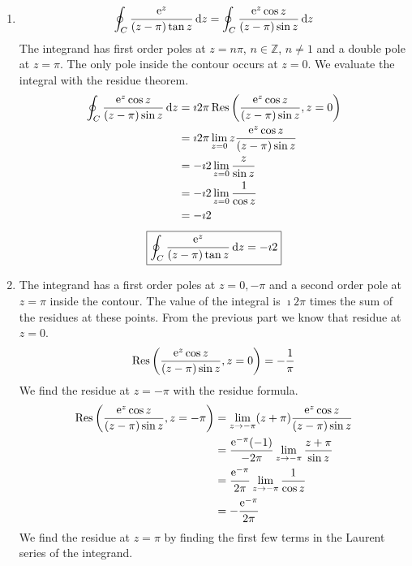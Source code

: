 {%
\begin{Solution}
  \label{solution e^z/((z-pi)tan(z))}
  \begin{enumerate}
  \item
    \[
    \oint_C \frac{\mathop{\mathrm{e}}\nolimits^z}{ (z - \pi) \tan z } \,\mathrm{d} z
    = \oint_C \frac{\mathop{\mathrm{e}}\nolimits^z \cos z}{ (z - \pi) \sin z } \,\mathrm{d} z
    \]
    The integrand has first order poles at $z = n \pi$, $n \in \mathbb{Z}$, 
    $n \neq 1$ and a double pole at $z = \pi$.
    The only pole inside the contour occurs at $z = 0$.  We evaluate the integral
    with the residue theorem.
    \begin{align*}
      \oint_C \frac{\mathop{\mathrm{e}}\nolimits^z \cos z}{ (z - \pi) \sin z } \,\mathrm{d} z
      &= \imath 2 \pi \mathop{\mathrm{Res}}\nolimits \left( \frac{\mathop{\mathrm{e}}\nolimits^z \cos z}{ (z - \pi) \sin z }, 
        z = 0 \right) \\
      &= \imath 2 \pi \lim_{z = 0} z \frac{\mathop{\mathrm{e}}\nolimits^z \cos z}{ (z - \pi) \sin z } \\
      &= - \imath 2 \lim_{z = 0} \frac{ z }{ \sin z } \\
      &= - \imath 2 \lim_{z = 0} \frac{ 1 }{ \cos z } \\
      &= - \imath 2 
    \end{align*}
    \[
    \boxed{
      \oint_C \frac{\mathop{\mathrm{e}}\nolimits^z}{ (z - \pi) \tan z } \,\mathrm{d} z = - \imath 2
      }
    \]
  \item
    The integrand has a first order poles at $z = 0, -\pi$ and a second order pole
    at $z = \pi$ inside the contour.  The value of the integral is $\imath 2 \pi$
    times the sum of the residues at these points.  From the previous part 
    we know that residue at $z = 0$.
    \[
    \mathop{\mathrm{Res}}\nolimits \left( \frac{\mathop{\mathrm{e}}\nolimits^z \cos z}{ (z - \pi) \sin z }, z = 0 \right) 
    = - \frac{1}{\pi}
    \]
    We find the residue at $z = -\pi$ with the residue formula.
    \begin{align*}
      \mathop{\mathrm{Res}}\nolimits \left( \frac{\mathop{\mathrm{e}}\nolimits^z \cos z}{ (z - \pi) \sin z }, z = -\pi \right)
      &= \lim_{z \to - \pi} (z + \pi) 
      \frac{\mathop{\mathrm{e}}\nolimits^z \cos z}{ (z - \pi) \sin z } \\
      &= \frac{ \mathop{\mathrm{e}}\nolimits^{-\pi} (-1) }{ -2 \pi }
      \lim_{z \to - \pi} \frac{ z + \pi }{ \sin z } \\
      &= \frac{ \mathop{\mathrm{e}}\nolimits^{-\pi} }{ 2 \pi } \lim_{z \to - \pi} \frac{ 1 }{ \cos z } 
      \\
      &= - \frac{ \mathop{\mathrm{e}}\nolimits^{-\pi} }{ 2 \pi } 
    \end{align*}
    We find the residue at $z = \pi$ by finding the first few terms in the 
    Laurent series of the integrand.

\end{enumerate}
\end{Solution}}
